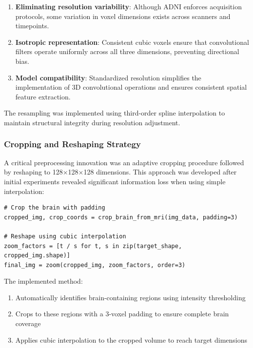 \documentclass[12pt, a4paper]{article}
\begin{document}
\begin{enumerate}
    \item \textbf{Eliminating resolution variability}: Although ADNI enforces acquisition protocols, some variation in voxel dimensions exists across scanners and timepoints.
    
    \item \textbf{Isotropic representation}: Consistent cubic voxels ensure that convolutional filters operate uniformly across all three dimensions, preventing directional bias.
    
    \item \textbf{Model compatibility}: Standardized resolution simplifies the implementation of 3D convolutional operations and ensures consistent spatial feature extraction.
\end{enumerate}

The resampling was implemented using third-order spline interpolation to maintain structural integrity during resolution adjustment.

\subsubsection{Cropping and Reshaping Strategy}

A critical preprocessing innovation was an adaptive cropping procedure followed by reshaping to 128$\times$128$\times$128 dimensions. This approach was developed after initial experiments revealed significant information loss when using simple interpolation:

\begin{verbatim}
# Crop the brain with padding
cropped_img, crop_coords = crop_brain_from_mri(img_data, padding=3)

# Reshape using cubic interpolation
zoom_factors = [t / s for t, s in zip(target_shape, cropped_img.shape)]
final_img = zoom(cropped_img, zoom_factors, order=3)
\end{verbatim}


The implemented method:
\begin{enumerate}
    \item Automatically identifies brain-containing regions using intensity thresholding
    \item Crops to these regions with a 3-voxel padding to ensure complete brain coverage
    \item Applies cubic interpolation to the cropped volume to reach target dimensions
\end{enumerate}
\end{document}
